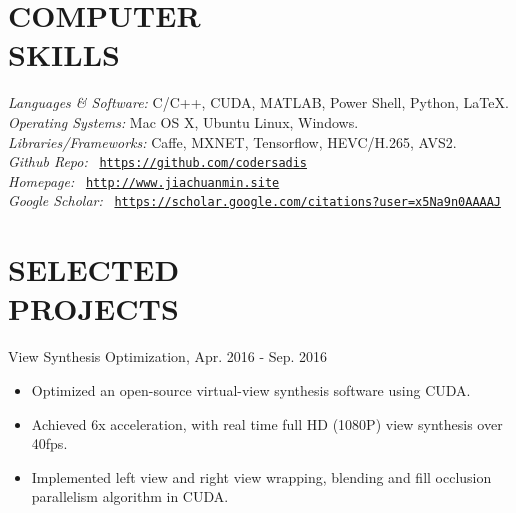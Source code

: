 \documentclass[margin, 10pt]{res} %
\begin{document}
\begin{resume}

\section{COMPUTER \\ SKILLS}

{\sl Languages \& Software:}
C/C++, CUDA, MATLAB, Power Shell, Python, \LaTeX. \\
{\sl Operating Systems:}
Mac OS X, Ubuntu Linux, Windows. \\
{\sl Libraries/Frameworks:}
Caffe, MXNET, Tensorflow, HEVC/H.265, AVS2. \\
{\sl Github Repo:}
\Pickup~{\href{https://github.com/codersadis}{\texttt{https://github.com/codersadis}}} \\
{\sl Homepage:}
\Pickup~{\href{http://http:www.jiachuanmin.site}{\texttt{http://www.jiachuanmin.site}}} \\
{\sl Google Scholar:}
\Pickup~{\href{https://scholar.google.com/citations?user=x5Na9n0AAAAJ}{\texttt{https://scholar.google.com/citations?user=x5Na9n0AAAAJ}}} \\



\section{SELECTED \\ PROJECTS}
View Synthesis Optimization, \hfill{Apr. 2016 - Sep. 2016}
\begin{itemize} \itemsep -2pt
    \item{Optimized an open-source virtual-view synthesis software using CUDA. }
    \item{Achieved 6x acceleration, with real time full HD (1080P) view synthesis over 40fps.}
    \item{Implemented left view and right view wrapping, blending and fill occlusion parallelism algorithm in CUDA.}
\end{itemize}


\end{resume}
\end{document}
